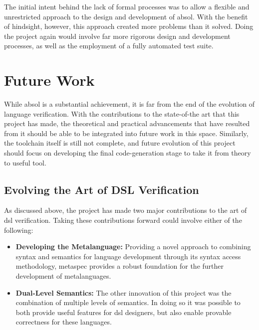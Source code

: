 The initial intent behind the lack of formal processes was to allow a flexible and unrestricted approach to the design and development of \gls{absol}.
With the benefit of hindsight, however, this approach created more problems than it solved.
Doing the project again would involve far more rigorous design and development processes, as well as the employment of a fully automated test suite.



\section{Future Work} %
\label{sec:future_work}

While \gls{absol} is a substantial achievement, it is far from the end of the evolution of language verification. 
With the contributions to the state-of-the art that this project has made, the theoretical and practical advancements that have resulted from it should be able to be integrated into future work in this space. 
Similarly, the toolchain itself is still not complete, and future evolution of this project should focus on developing the final code-generation stage to take it from theory to useful tool.

\subsection{Evolving the Art of DSL Verification} %
\label{sub:evolving_the_art_of_dsl_verification}
As discussed above, the project has made two major contributions to the art of \gls{dsl} verification.
Taking these contributions forward could involve either of the following:
\begin{itemize}
    \item \textbf{Developing the Metalanguage:} Providing a novel approach to combining syntax and semantics for language development through its syntax access methodology, \gls{metaspec} provides a robust foundation for the further development of metalanguages.
    \item \textbf{Dual-Level Semantics:} The other innovation of this project was the combination of multiple levels of semantics.
    In doing so it was possible to both provide useful features for \gls{dsl} designers, but also enable provable correctness for these languages.
\end{itemize}

